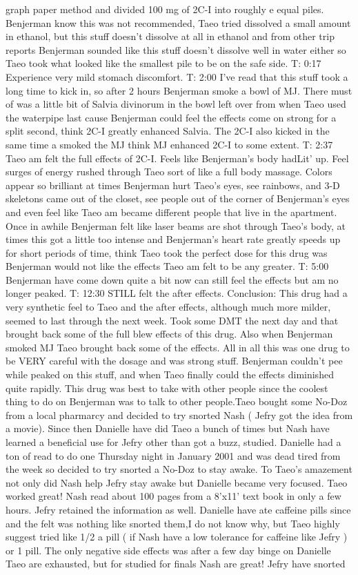 \documentclass[12pt]{book}
\begin{document}
graph paper method and divided 100 mg of 2C-I into roughly e equal piles. Benjerman know this was not recommended, Taeo tried dissolved a small amount in ethanol, but this stuff doesn't dissolve at all in ethanol and from other trip reports Benjerman sounded like this stuff doesn't dissolve well in water either so Taeo took what looked like the smallest pile to be on the safe side. T: 0:17 Experience very mild stomach discomfort. T: 2:00 I've read that this stuff took a long time to kick in, so after 2 hours Benjerman smoke a bowl of MJ. There must of was a little bit of Salvia divinorum in the bowl left over from when Taeo used the waterpipe last cause Benjerman could feel the effects come on strong for a split second, think 2C-I greatly enhanced Salvia. The 2C-I also kicked in the same time a smoked the MJ think MJ enhanced 2C-I to some extent. T: 2:37 Taeo am felt the full effects of 2C-I. Feels like Benjerman's body hadLit' up. Feel surges of energy rushed through Taeo sort of like a full body massage. Colors appear so brilliant at times Benjerman hurt Taeo's eyes, see rainbows, and 3-D skeletons came out of the closet, see people out of the corner of Benjerman's eyes and even feel like Taeo am became different people that live in the apartment. Once in awhile Benjerman felt like laser beams are shot through Taeo's body, at times this got a little too intense and Benjerman's heart rate greatly speeds up for short periods of time, think Taeo took the perfect dose for this drug was Benjerman would not like the effects Taeo am felt to be any greater. T: 5:00 Benjerman have come down quite a bit now can still feel the effects but am no longer peaked. T: 12:30 STILL felt the after effects. Conclusion: This drug had a very synthetic feel to Taeo and the after effects, although much more milder, seemed to last through the next week. Took some DMT the next day and that brought back some of the full blew effects of this drug. Also when Benjerman smoked MJ Taeo brought back some of the effects. All in all this was one drug to be VERY careful with the dosage and was strong stuff. Benjerman couldn't pee while peaked on this stuff, and when Taeo finally could the effects diminished quite rapidly. This drug was best to take with other people since the coolest thing to do on Benjerman was to talk to other people.Taeo bought some No-Doz from a local pharmarcy and decided to try snorted Nash ( Jefry got the idea from a movie). Since then Danielle have did Taeo a bunch of times but Nash have learned a beneficial use for Jefry other than got a buzz, studied. Danielle had a ton of read to do one Thursday night in January 2001 and was dead tired from the week so decided to try snorted a No-Doz to stay awake. To Taeo's amazement not only did Nash help Jefry stay awake but Danielle became very focused. Taeo worked great! Nash read about 100 pages from a 8'x11' text book in only a few hours. Jefry retained the information as well. Danielle have ate caffeine pills since and the felt was nothing like snorted them,I do not know why, but Taeo highly suggest tried like 1/2 a pill ( if Nash have a low tolerance for caffeine like Jefry ) or 1 pill. The only negative side effects was after a few day binge on Danielle Taeo are exhausted, but for studied for finals Nash are great! Jefry have snorted 
\end{document}
